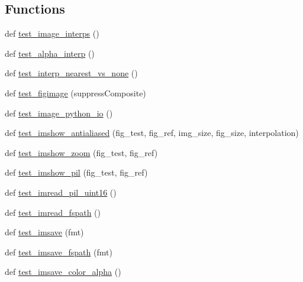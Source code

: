 \subsection*{Functions}
\begin{DoxyCompactItemize}
\item 
def \hyperlink{namespacematplotlib_1_1tests_1_1test__image_a7b655d7cb65e75bbe30d68d1d9de8e0e}{test\+\_\+image\+\_\+interps} ()
\item 
def \hyperlink{namespacematplotlib_1_1tests_1_1test__image_ac94c657d66fa0e358f8bed5ed82e867d}{test\+\_\+alpha\+\_\+interp} ()
\item 
def \hyperlink{namespacematplotlib_1_1tests_1_1test__image_a302ffff2e2ce3c7c415decd2bcfafbe2}{test\+\_\+interp\+\_\+nearest\+\_\+vs\+\_\+none} ()
\item 
def \hyperlink{namespacematplotlib_1_1tests_1_1test__image_a389495603fcd6a5787d1692d9c7c9999}{test\+\_\+figimage} (suppress\+Composite)
\item 
def \hyperlink{namespacematplotlib_1_1tests_1_1test__image_a5feffd01731ad0cfdf9cf692ea64322e}{test\+\_\+image\+\_\+python\+\_\+io} ()
\item 
def \hyperlink{namespacematplotlib_1_1tests_1_1test__image_a0e9d27f80fd43941523704add513398e}{test\+\_\+imshow\+\_\+antialiased} (fig\+\_\+test, fig\+\_\+ref, img\+\_\+size, fig\+\_\+size, interpolation)
\item 
def \hyperlink{namespacematplotlib_1_1tests_1_1test__image_a218bdd95ace23146bf962b27b7c5f4ad}{test\+\_\+imshow\+\_\+zoom} (fig\+\_\+test, fig\+\_\+ref)
\item 
def \hyperlink{namespacematplotlib_1_1tests_1_1test__image_a45bb10bbb5decc1496e6473e2acb9b2d}{test\+\_\+imshow\+\_\+pil} (fig\+\_\+test, fig\+\_\+ref)
\item 
def \hyperlink{namespacematplotlib_1_1tests_1_1test__image_ac51b1091902234cdd069f3a3e6ad4b46}{test\+\_\+imread\+\_\+pil\+\_\+uint16} ()
\item 
def \hyperlink{namespacematplotlib_1_1tests_1_1test__image_abed7652c141c72302d9fcd12841c81c7}{test\+\_\+imread\+\_\+fspath} ()
\item 
def \hyperlink{namespacematplotlib_1_1tests_1_1test__image_ad6470a262b97215b5d554c9f520f7add}{test\+\_\+imsave} (fmt)
\item 
def \hyperlink{namespacematplotlib_1_1tests_1_1test__image_af95dba458fa3c48bfcdae33d96f6ed1b}{test\+\_\+imsave\+\_\+fspath} (fmt)
\item 
def \hyperlink{namespacematplotlib_1_1tests_1_1test__image_a4583b55a8ae7b64086ee21c688c2ac26}{test\+\_\+imsave\+\_\+color\+\_\+alpha} ()

\end{DoxyCompactItemize}
